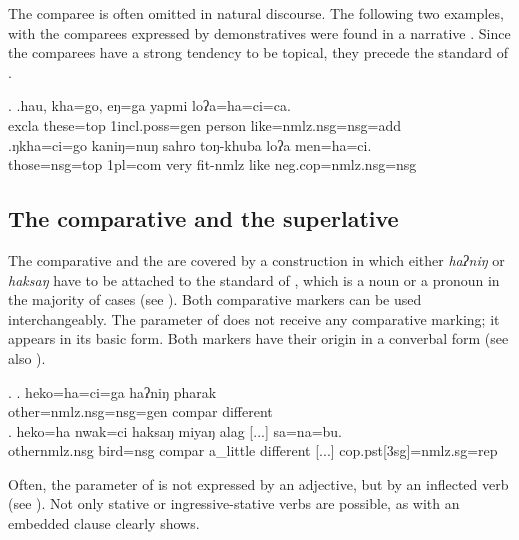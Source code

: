  The comparee is often omitted in natural discourse. The following two examples, with the comparees expressed by demonstratives were found in a narrative \Next.  Since the comparees have a strong tendency to be  topical, they precede the standard of .

\ex. \ag.hau,  kha=go,      eŋ=ga              yapmi  loʔa=ha=ci=ca.\\
{\sc excla} these{\sc =top} {\sc 1incl.poss=gen} person like{\sc =nmlz.nsg=nsg=add}\\
 
\bg.ŋkha=ci=go  kaniŋ=nuŋ   sahro toŋ-khuba   loʔa men=ha=ci.\\
  those{\sc =nsg=top} {\sc 1pl=com} very fit-{\sc nmlz} like {\sc neg.cop=nmlz.nsg=nsg}\\
   


\subsection{The comparative and the superlative}

The comparative and the  are covered by a construction in which either \emph{haʔniŋ} or \emph{haksaŋ} have to be attached to the standard of , which is a noun or a pronoun in the majority of cases (see \Next). Both comparative markers can be used interchangeably. The parameter of  does not receive any comparative marking; it appears in its basic form. Both markers have their origin in a converbal form (see also ).

\ex. \ag. heko=ha=ci=ga haʔniŋ  pharak\\
other{\sc =nmlz.nsg=nsg=gen} {\sc compar} different\\
\bg. heko=ha nwak=ci haksaŋ miyaŋ alag [...] sa=na=bu.\\
	other{\sc nmlz.nsg} bird{\sc =nsg} {\sc compar}  a\_little different [...] {\sc cop.pst[3sg]=nmlz.sg=rep}\\
	 
	
Often, the parameter of  is not expressed by an adjective, but by an inflected verb (see \Next). Not only stative or ingressive-stative verbs are possible, as \Next[b] with an embedded clause clearly shows.


